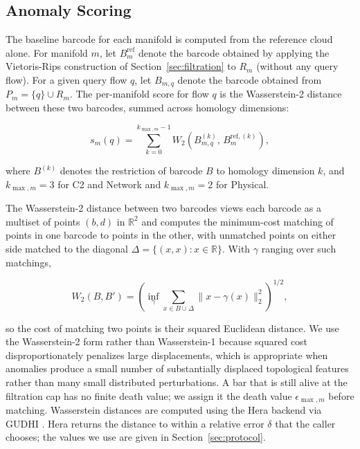 \documentclass[conf]{new-aiaa}
\begin{document}
\subsection{Anomaly Scoring}
\label{sec:scoring}

The baseline barcode for each manifold is computed from the reference cloud alone. For manifold $m$, let $B_m^{\text{ref}}$ denote the barcode obtained by applying the Vietoris-Rips construction of Section~\ref{sec:filtration} to $R_m$ (without any query flow). For a given query flow $q$, let $B_{m,q}$ denote the barcode obtained from $P_m = \{q\} \cup R_m$. The per-manifold score for flow $q$ is the Wasserstein-2 distance between these two barcodes, summed across homology dimensions:

\begin{equation}
s_m(q) = \sum_{k=0}^{k_{\max,m}-1} W_2\!\left( B_{m,q}^{(k)},\, B_m^{\text{ref},(k)} \right),
\label{eq:anomaly_score}
\end{equation}

where $B^{(k)}$ denotes the restriction of barcode $B$ to homology dimension $k$, and $k_{\max,m} = 3$ for C2 and Network and $k_{\max,m} = 2$ for Physical.

The Wasserstein-2 distance between two barcodes views each barcode as a multiset of points $(b, d)$ in $\mathbb{R}^2$ and computes the minimum-cost matching of points in one barcode to points in the other, with unmatched points on either side matched to the diagonal $\Delta = \{(x, x) : x \in \mathbb{R}\}$. With $\gamma$ ranging over such matchings,

\begin{equation}
W_2(B, B') = \left( \inf_{\gamma} \sum_{x \in B \cup \Delta} \| x - \gamma(x) \|_2^2 \right)^{1/2},
\label{eq:wasserstein}
\end{equation}

so the cost of matching two points is their squared Euclidean distance. We use the Wasserstein-2 form rather than Wasserstein-1 because squared cost disproportionately penalizes large displacements, which is appropriate when anomalies produce a small number of substantially displaced topological features rather than many small distributed perturbations. A bar that is still alive at the filtration cap has no finite death value; we assign it the death value $\epsilon_{\max,m}$ before matching. Wasserstein distances are computed using the Hera backend \cite{Kerber} via GUDHI \cite{Maria}. Hera returns the distance to within a relative error $\delta$ that the caller chooses; the values we use are given in Section~\ref{sec:protocol}.
\end{document}
